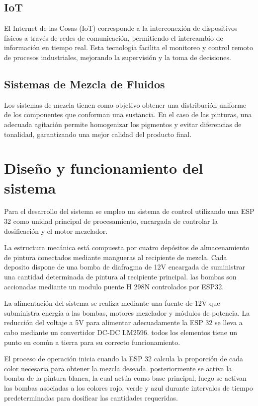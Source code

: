 \documentclass[conference]{IEEEtran}
\begin{document}
\subsection*{IoT}
El Internet de las Cosas (IoT) corresponde a la interconexi\'on de dispositivos f\'isicos a trav\'es de redes de comunicaci\'on, permitiendo el intercambio de informaci\'on en tiempo real. Esta tecnolog\'ia facilita el monitoreo y control remoto de procesos industriales, mejorando la supervisi\'on y la toma de decisiones.

\subsection*{Sistemas de Mezcla de Fluidos}
Los sistemas de mezcla tienen como objetivo obtener una distribuci\'on uniforme de los componentes que conforman una sustancia. En el caso de las pinturas, una adecuada agitaci\'on permite homogenizar los pigmentos y evitar diferencias de tonalidad, garantizando una mejor calidad del producto final.

\section{Dise\~no y funcionamiento del sistema}
Para el desarrollo del sistema se empleo un sistema de control utilizando  una ESP 32 como unidad principal de procesamiento, encargada de controlar la dosificaci\'on y el motor mezclador.

La estructura mec\'anica est\'a compuesta por cuatro dep\'ositos de almacenamiento de pintura conectados mediante mangueras  al recipiente de mezcla. Cada deposito dispone de una bomba de diafragma de 12V encargada de suministrar una cantidad determinada de pintura al recipiente principal. las bombas son accionadas mediante un modulo puente H 298N controlados por ESP32.

La alimentaci\'on del sistema se realiza mediante una fuente de 12V que subministra energ\'ia a las bombas, motores mezclador y m\'odulos de potencia. La reducci\'on del voltaje a 5V para alimentar adecuadamente la ESP 32 se lleva a cabo mediante un convertidor DC-DC LM2596. todos los elementos tiene un punto en com\'un a tierra para su correcto funcionamiento.

El proceso de operaci\'on inicia cuando la ESP 32 calcula la proporci\'on de cada color necesaria para obtener la mezcla deseada. posteriormente se activa la  bomba de la pintura blanca, la cual act\'ua como base principal, luego se activan las bombas asociadas a los colores rojo, verde y azul durante intervalos de tiempo predeterminadas para dosificar las cantidades requeridas.
\end{document}
